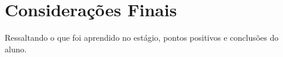 

\section{Considerações Finais}
    \label{sec:consideracoes-finais}
    
    Ressaltando o que foi aprendido no estágio, pontos positivos e conclusões do aluno.
    